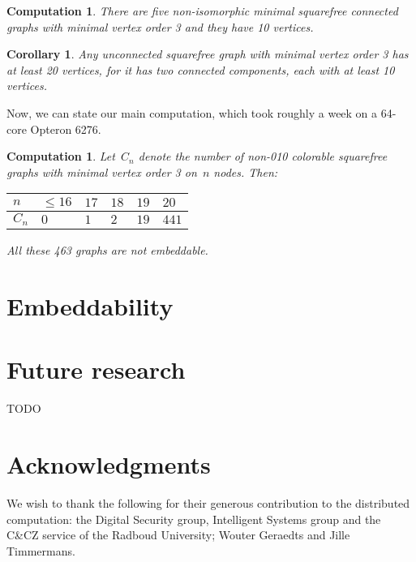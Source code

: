 \documentclass[a4paper]{article}
\newcounter{main}
\newtheorem{comp}[main]{Computation}
\newtheorem{cor}[main]{Corollary}
\theoremstyle{definition}
\theoremstyle{remark}
\begin{document}
\begin{comp}
    There are five non-isomorphic minimal
    squarefree connected graphs
    with minimal vertex order 3 and they have 10 vertices.
\end{comp}
\begin{cor}
    Any unconnected
    squarefree graph with minimal vertex order 3
    has at least 20 vertices, for it has two connected components,
    each with at least 10 vertices.
\end{cor}
Now, we can state our main computation, which took roughly a week
    on a 64-core Opteron 6276.
\begin{comp}
    Let~$C_n$ denote the number of non-010 colorable squarefree
    graphs with minimal vertex order 3 on~$n$ nodes.  Then:

    \begin{center}
    \begin{tabular}{l|lllll}
        $n$ & $\leq 16$
            & $17$
            & $18$
            & $19$
            & $20$ \\
        \hline
        $C_n$ & $0$
            & $1$
            & $2$
            & $19$
            & $441$
    \end{tabular}
    \end{center}

    All these 463 graphs are not embeddable.
\end{comp}


\section{Embeddability}
\label{sec:emb}


\section{Future research}
TODO

\section{Acknowledgments}
We wish to thank the following for their generous contribution to the
distributed computation:
    the Digital Security group, Intelligent Systems group
    and the C\&CZ service of the Radboud University;
    Wouter Geraedts and
    Jille Timmermans.

{}

\end{document}
